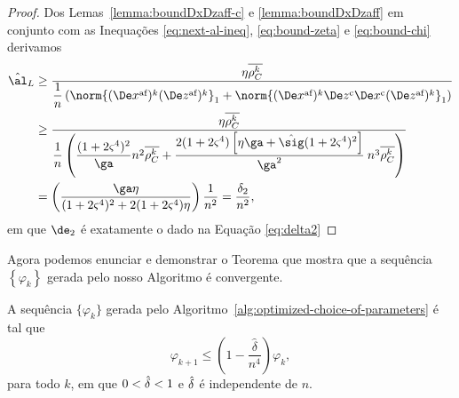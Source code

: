 \begin{proof}
Dos Lemas~\ref{lemma:boundDxDzaff-c} e  \ref{lemma:boundDxDzaff} em conjunto com  as Inequações \eqref{eq:next-al-ineq}, \eqref{eq:bound-zeta} e \eqref{eq:bound-chi} derivamos
\[
\begin{aligned}
\nextal_L  & \geq \frac{\eta\rhoCkb  } {\dfrac{1}{n} \left(\norm{ \dekx  \dekz }_1 +  \norm{ \dekx \Decoz  \Decox \dekz }_1 \right) } \\
		   & \geq \dfrac{\eta\rhoCkb  } {\dfrac{1}{n} \left(\dfrac{(1 + 2\bdxzstar^{4})^{2} }{\ga} n^{2}\rhoCkb + \dfrac{2(1+2\bdxzstar^{4})\left[\eta\ga + \nextsig(1+2\bdxzstar^{4})^{2}\right]}{\ga^{2}}\: n^{3}\rhoCkb  \right) } \\
		   & = \left( \dfrac{\ga\eta } {(1 + 2\bdxzstar^{4})^{2}  + 2(1+2\bdxzstar^{4})\eta}\right) \dfrac{1}{n^{2}} = \frac{\delta_{2}}{n^{2}}, 
\end{aligned}
\]
em que $\de_{2}$ é exatamente o dado na Equação \eqref{eq:delta2}
\end{proof}
 
Agora podemos enunciar e demonstrar o Teorema que mostra que a sequência $\left\{ \varphi_{k}\right\}$ gerada pelo nosso Algoritmo é convergente. 

\begin{teo}\label{teo:next-phi-delta-n4}
A sequência $\{\varphi_{k}\}$ gerada pelo Algoritmo~\ref{alg:optimized-choice-of-parameters} é tal que
\begin{equation}
		\label{eq:varphi-delta-n4}
				\varphi_{k+1}\leq \left(1 - \frac{\hat{\delta}}{n^{4}}\right)\varphi_{k},
	\end{equation}
	para todo $k$, em que $0<\hat{\delta}<1$ e $\hat{\delta}$ é independente de $n$.
\end{teo}


